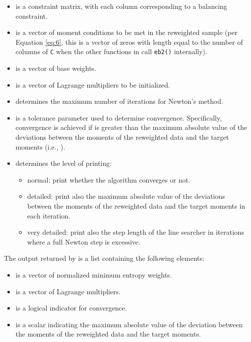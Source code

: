 \begin{itemize}
\tightlist
\item
   is a constraint matrix, with each column corresponding to a
  balancing constraint.
\item
   is a vector of moment conditions to be met in the reweighted
  sample (per Equation \ref{eq:6}, this is a vector of zeros with length
  equal to the number of columns of \texttt{C} when the other functions
  in  call \texttt{eb2()} internally).
\item
   is a vector of base weights.
\item
   is a vector of Lagrange multipliers to be initialized.
\item
   determines the maximum number of iterations for
  Newton's method.
\item
   is a tolerance parameter used to determine convergence.
  Specifically, convergence is achieved if  is greater than
  the maximum absolute value of the deviations between the moments of
  the reweighted data and the target moments (i.e., ).
\item
   determines the level of printing:

  \begin{itemize}
  \tightlist
  \item
     normal: print whether the algorithm converges or not.
  \item
     detailed: print also the maximum absolute value of the
    deviations between the moments of the reweighted data and the target
    moments in each iteration.
  \item
     very detailed: print also the step length of the line
    searcher in iterations where a full Newton step is excessive.
  \end{itemize}
\end{itemize}

The output returned by  is a list containing the following
elements:

\begin{itemize}
\tightlist
\item
   is a vector of normalized minimum entropy weights.
\item
   is a vector of Lagrange multipliers.
\item
   is a logical indicator for convergence.
\item
   is a scalar indicating the maximum absolute value of
  the deviation between the moments of the reweighted data and the
  target moments.
\end{itemize}

